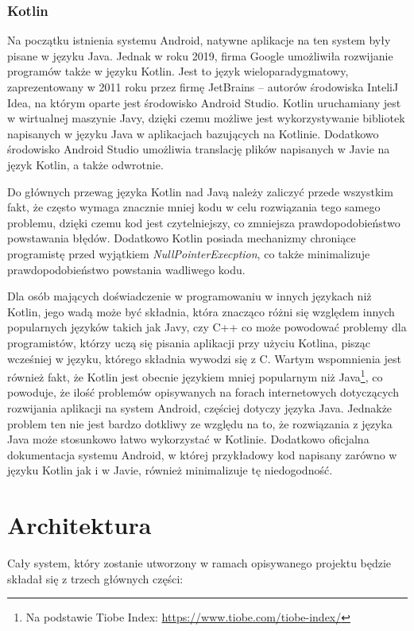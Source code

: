 \documentclass[a4paper,12pt,twoside,openany]{report}
\begin{document}
\subsection{Kotlin}
Na początku istnienia systemu Android, natywne aplikacje na ten system były pisane w języku Java. Jednak w roku 2019, firma Google umożliwiła rozwijanie programów także w języku Kotlin. Jest to język wieloparadygmatowy, zaprezentowany w 2011 roku przez firmę JetBrains -- autorów środowiska InteliJ Idea, na którym oparte jest środowisko Android Studio. Kotlin uruchamiany jest w wirtualnej maszynie Javy, dzięki czemu możliwe jest wykorzystywanie bibliotek napisanych w języku Java w aplikacjach bazujących na Kotlinie. Dodatkowo środowisko Android Studio umożliwia translację plików napisanych w Javie na język Kotlin, a także odwrotnie. 

Do głównych przewag języka Kotlin nad Javą należy zaliczyć przede wszystkim fakt, że często wymaga znacznie mniej kodu w celu rozwiązania tego samego problemu, dzięki czemu kod jest czytelniejszy, co zmniejsza prawdopodobieństwo powstawania błędów. Dodatkowo Kotlin posiada mechanizmy chroniące programistę przed wyjątkiem \textit{NullPointerExecption}, co także minimalizuje prawdopodobieństwo powstania wadliwego kodu. 

Dla osób mających doświadczenie w programowaniu w innych językach niż Kotlin, jego wadą może być składnia, która znacząco różni się względem innych popularnych języków takich jak Javy, czy C++ co może powodować problemy dla programistów, którzy uczą się pisania aplikacji przy użyciu  Kotlina, pisząc wcześniej w języku, którego składnia wywodzi się z C. Wartym wspomnienia jest również fakt, że Kotlin jest obecnie językiem mniej popularnym niż Java\footnote{Na podstawie Tiobe Index: \url{ https://www.tiobe.com/tiobe-index/}}, co powoduje, że ilość problemów opisywanych na forach internetowych dotyczących rozwijania aplikacji na system Android, częściej dotyczy języka Java. Jednakże problem ten nie jest bardzo dotkliwy ze względu na to, że rozwiązania z języka Java może stosunkowo łatwo wykorzystać w Kotlinie. Dodatkowo oficjalna dokumentacja systemu Android, w której przykładowy kod napisany zarówno w języku Kotlin jak i w Javie, również minimalizuje tę niedogodność. 

\chapter{Architektura}
Cały system, który zostanie utworzony w ramach opisywanego projektu będzie składał się z trzech głównych części: 
\end{document}
